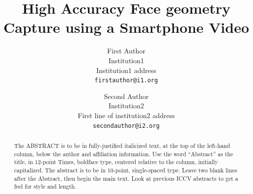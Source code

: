 \documentclass[10pt,twocolumn,letterpaper]{article}
\begin{document}
\title{High Accuracy Face geometry Capture using a Smartphone Video}

\author{First Author\\
Institution1\\
Institution1 address\\
{\tt\small firstauthor@i1.org}
\and
Second Author\\
Institution2\\
First line of institution2 address\\
{\tt\small secondauthor@i2.org}
}




\begin{abstract}
   The ABSTRACT is to be in fully-justified italicized text, at the top
   of the left-hand column, below the author and affiliation
   information. Use the word ``Abstract'' as the title, in 12-point
   Times, boldface type, centered relative to the column, initially
   capitalized. The abstract is to be in 10-point, single-spaced type.
   Leave two blank lines after the Abstract, then begin the main text.
   Look at previous ICCV abstracts to get a feel for style and length.
\end{abstract}
\end{document}
